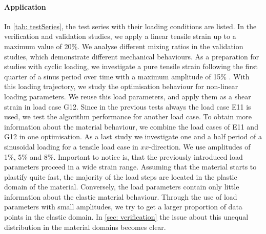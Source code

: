 \paragraph{Application}
In \autoref{tab: testSeries}, the test series with their loading conditions are listed.
In the verification and validation studies, we apply a linear tensile strain up to a maximum value of 20\%.
We analyse different mixing ratios in the validation studies, which demonstrate different mechanical behaviours.
As a preparation for studies with cyclic loading, we investigate a pure tensile strain following the first quarter of a sinus period over time with a maximum amplitude of 15\% . With this loading trajectory, we study the optimisation behaviour for non-linear loading parameters.
We reuse this load parameters, and apply them as a shear strain in load case G12. Since in the previous tests always the load case E11 is used, we test the algorithm performance for another load case.
To obtain more information about the material behaviour, we combine the load cases of E11 and G12 in one optimisation. 
As a last study we investigate one and a half period of a sinusoidal loading for a tensile load case in $xx$-direction. We use amplitudes of 1\%, 5\% and 8\%. Important to notice is, that the previously introduced load parameters proceed in a wide strain range. Assuming that the material starts to plastify quite fast, the majority of the load steps are located in the plastic domain of the material. Conversely, the load parameters contain only little information about the elastic material behaviour. 
Through the use of load parameters with small amplitudes, we try to get a larger proportion of data points in the elastic domain.
In \autoref{sec: verification} the issue about this unequal distribution in the material domains becomes clear.    

